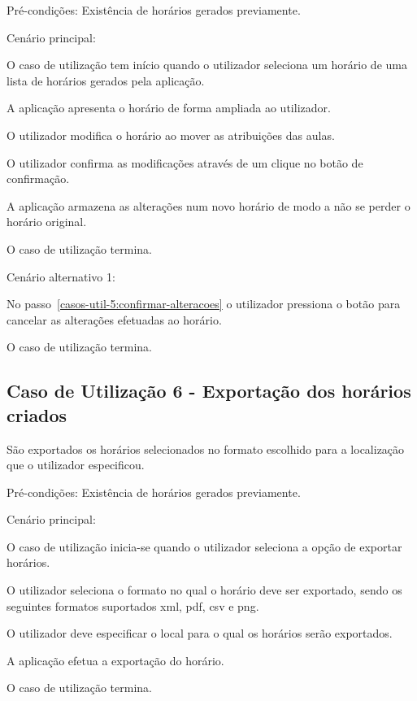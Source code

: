 Pré-condições: Existência de horários gerados previamente.

Cenário principal:

\begin{compactenum}
    \item O caso de utilização tem início quando o utilizador seleciona um horário de uma lista de horários gerados pela aplicação.
    \item A aplicação apresenta o horário de forma ampliada ao utilizador.
    \item O utilizador modifica o horário ao mover as atribuições das aulas.
    \item O utilizador confirma as modificações através de um clique no botão de confirmação. \label{casos-util-5:confirmar-alteracoes}
    \item A aplicação armazena as alterações num novo horário de modo a não se perder o horário original.
    \item O caso de utilização termina.
\end{compactenum}

Cenário alternativo 1:

\begin{compactenum}
    \item No passo~\ref{casos-util-5:confirmar-alteracoes} o utilizador pressiona o botão para cancelar as alterações efetuadas ao horário.
    \item O caso de utilização termina.
\end{compactenum}

\subsection*{Caso de Utilização 6 - Exportação dos horários criados}
São exportados os horários selecionados no formato escolhido para a localização que o utilizador especificou.

Pré-condições: Existência de horários gerados previamente.

Cenário principal:

\begin{compactenum}
    \item O caso de utilização inicia-se quando o utilizador seleciona a opção de exportar horários.
    \item O utilizador seleciona o formato no qual o horário deve ser exportado, sendo os seguintes formatos suportados \gls{xml}, \gls{pdf}, \gls{csv} e \gls{png}.
    \item O utilizador deve especificar o local para o qual os horários serão exportados.
    \item A aplicação efetua a exportação do horário.
    \item O caso de utilização termina.
\end{compactenum}

